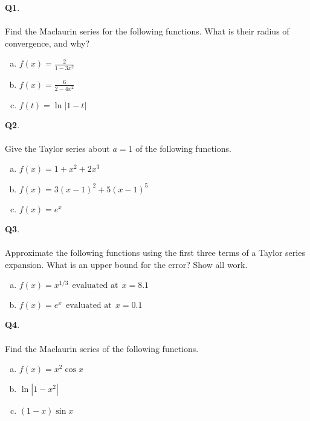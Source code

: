 \documentclass[12pt, oneside]{amsart}
\begin{document}
\vfill


\newpage
\noindent
\textbf{Q1}.\\ \\ Find the Maclaurin series for the following functions. What is their radius of convergence, and why? \\

\begin{enumerate}[a)]
  \item
    $\displaystyle{f(x) = \frac{2}{1 - 3x^{2}}}$
          \vspace{6cm}
   \item
         $\displaystyle{f(x) = \frac{6}{2 - 4x^{2}}}$
     \vspace{6cm}
   \item
     $\displaystyle{f(t)=\ln | 1 - t |}$
     \vspace{6cm}
     \newpage
     \end{enumerate}
\newpage
\noindent
\textbf{Q2}. \\ \\ Give the Taylor series about $a=1$ of the following functions. \\ 

\begin{enumerate}[a)]
  \item
    $\displaystyle{f(x) = 1 + x^{2} + 2x^{3}}$
    \vspace{6cm}
  \item
    $\displaystyle{f(x) = 3(x-1)^{2} + 5(x-1)^{5}}$
\vspace{6cm}
\item
  $f(x) = e^{x}$
  \newpage
   \end{enumerate}
\newpage
\noindent
\textbf{Q3}. \\ \\ Approximate the following functions using the first three terms of a Taylor series expansion. What is an upper bound for the error? Show all work. \\
\begin{enumerate}[a)]
  \item
    $\displaystyle{f(x)=x^{1/3}} \ \ \text{evaluated at} \ \ x=8.1$
    \vspace{12cm}
  \item
   $\displaystyle{f(x)=e^{x}} \ \ \text{evaluated at} \ \ x=0.1$
  \newpage
\end{enumerate}



\newpage
\noindent
\textbf{Q4}. \\ \\ Find the Maclaurin series of the following functions. \\ 
\begin{enumerate}[a)]
  \item
$\displaystyle{f(x) = x^{2} \cos x}$
    \vspace{6cm}
  \item
    $\displaystyle{\ln|1-x^{2}|}$
\vspace{6cm}
\item
  $ \displaystyle{(1-x)\sin x}$
  \newpage
\end{enumerate}
\end{document}
